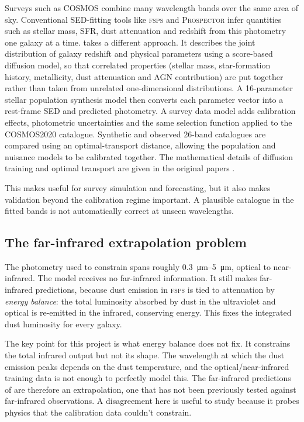 \documentclass[12pt,a4paper]{article}
\begin{document}
Surveys such as COSMOS \citep{Scoville_2007} combine many wavelength bands over the
same area of sky. Conventional SED-fitting tools like \textsc{fsps}
\citep{Conroy_2009} and \textsc{Prospector} \citep{Leja_2017} infer quantities such as
stellar mass, SFR, dust attenuation and redshift from this photometry one galaxy at a
time. \popcosmos{} \citep{Alsing_2024,Thorp_2024} takes a different approach. It
describes the joint distribution of galaxy redshift and physical parameters using a
score-based diffusion model, so that correlated properties (stellar mass,
star-formation history, metallicity, dust attenuation and AGN contribution) are put
together rather than taken from unrelated one-dimensional distributions. A 16-parameter
stellar population synthesis model then converts each parameter vector into a
rest-frame SED and predicted photometry. A survey data model adds calibration effects,
photometric uncertainties and the same selection function applied to the COSMOS2020
catalogue. Synthetic and observed 26-band catalogues are compared using an
optimal-transport distance, allowing the population and nuisance models to be
calibrated together. The mathematical details of diffusion training and optimal
transport are given in the original papers \citep{Alsing_2024,Thorp_2024}.

This makes \popcosmos{} useful for survey simulation and
forecasting, but it also makes validation beyond the calibration regime important. A plausible
catalogue in the fitted bands is not automatically correct at unseen wavelengths.

\subsection{The far-infrared extrapolation problem}
\label{sec:intro:extrapolation}

The photometry used to constrain \popcosmos{} spans roughly \SIrange{0.3}{5}{\um},
optical to near-infrared. The model receives no far-infrared information. It still makes
far-infrared predictions, because dust emission in \textsc{fsps} is tied to attenuation
by \emph{energy balance}: the total luminosity absorbed by dust in the ultraviolet and
optical is re-emitted in the infrared, conserving energy. This fixes the integrated dust
luminosity \LIR{} for every galaxy.

The key point for this project is what energy balance does not fix. It constrains
the total infrared output but not its shape. The wavelength at which the dust emission
peaks depends on the dust temperature, and the optical/near-infrared training
data is not enough to perfectly model this. The far-infrared predictions of \popcosmos{} are therefore an
extrapolation, one that has not been previously tested against far-infrared observations.
A disagreement here
is useful to study because it probes physics that the calibration data couldn't
constrain.
\end{document}

